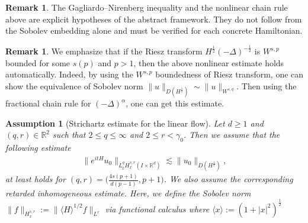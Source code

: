 \documentclass[10pt%
]{amsart}
\numberwithin{equation}{section}
\newtheorem{assumption}{Assumption}[section]
\theoremstyle{definition}
\newtheorem{remark}[theorem]{Remark}
\begin{document}
	\begin{remark}\label{rem:abstract-nonlinear-estimates}
		The Gagliardo--Nirenberg inequality and the nonlinear chain rule above are explicit hypotheses of the abstract framework. They do not follow from the Sobolev embedding alone and must be verified for each concrete Hamiltonian.
	\end{remark}
	\begin{remark}



	   We emphasize that if the Riesz transform $H^\frac{1}{2}(-\Delta)^{-\frac12}$ is $W^{s,p}$ bounded for some $s(p)$ and $p>1$, then the above nonlinear estimate holds automatically. Indeed, by using the $W^{s,p}$ boundedness of Riesz transform, one can show the equivalence of Sobolev norm $\|u\|_{D(H^\frac12)}\sim\|u\|_{W^{s,q}}$. Then using the fractional chain rule for $(-\Delta)^\alpha$, one can get this estimate.
	\end{remark}

	\begin{assumption}[Strichartz estimate for the linear flow]\label{ass-strichartz}
		Let $d\geq1$ and $(q,r)\in\mathbb R^2$ such that $2\leq q\leq\infty$ and $2\leq r<\gamma_0$. Then we assume that the following estimate 
		\begin{align*}
			\big\|e^{itH}u_0\big\|_{L_t^qH_x^{s,r}(I\times\mathbb R^d)}\lesssim \|u_0\|_{D(H^\frac{1}{2})},
		\end{align*}
		at least holds for $(q,r)=\big(\frac{4s(p+1)}{d(p-1)},p+1\big)$. We also assume the corresponding retarded inhomogeneous estimate. Here, we define the Sobolev norm $\|f\|_{H_x^{s,r}}:=\|\langle H\rangle^{1/2}f\|_{L^r}$ via functional calculus where $\langle x\rangle:=(1+|x|^2)^\frac12$ 
	\end{assumption}
	
	
	
\end{document}

